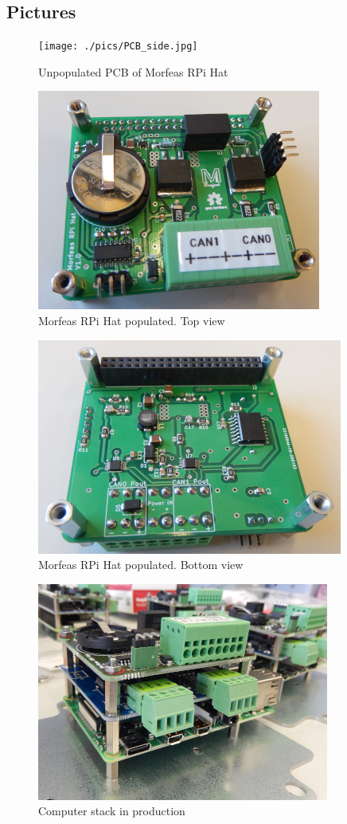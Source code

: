 \subsection{Pictures}
\begin{figure}[ht]
\centering
	\texttt{[image: ./pics/PCB\_side.jpg]}
	\caption{Unpopulated PCB of Morfeas RPi Hat}
\end{figure}
\begin{figure}[ht]
\centering
	\includegraphics[angle=0]{./pics/Morfeas_RPi_HAT_top.png}
	\caption{Morfeas RPi Hat populated. Top view}
\end{figure}
\begin{figure}[ht]
\centering
	\includegraphics[angle=0]{./pics/Morfeas_RPi_HAT_bottom.png}
	\caption{Morfeas RPi Hat populated. Bottom view}
\end{figure}
\begin{figure}[ht]
\centering
	\includegraphics[angle=0]{./pics/Morfeas_stack.png}
	\caption{Computer stack in production}
\end{figure}
